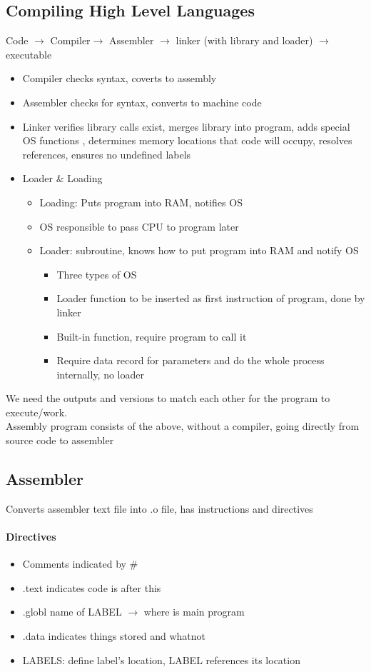 \documentclass[12 pt]{article}
\begin{document}
\subsection{Compiling High Level Languages} Code $\to$ Compiler$\to$ Assembler $\to$ linker (with library and loader) $\to$ executable
\begin{itemize}
\item Compiler checks syntax, coverts to assembly
\item Assembler checks for syntax, converts to machine code
\item Linker verifies library calls exist, merges library into program, adds special OS functions , determines memory locations that code will occupy, resolves references, ensures no undefined labels
\item Loader \& Loading
\begin{itemize}
\item Loading: Puts program into RAM, notifies OS
\item OS responsible to pass CPU to program later
\item Loader: subroutine, knows how to put program into RAM and notify OS
\begin{itemize}
\item Three types of OS
\item Loader function to be inserted as first instruction of program, done by linker
\item Built-in function, require program to call it
\item Require data record for parameters and do the whole process internally, no loader
\end{itemize}
\end{itemize}
\end{itemize}
We need the outputs and versions to match each other for the program to execute/work.
\\ Assembly program consists of the above, without a compiler, going directly from source code to assembler
\subsection{Assembler} Converts assembler text file into .o file, has instructions and directives
\paragraph{Directives}
\begin{itemize}
		\item Comments indicated by \#
		\item .text indicates code is after this
		\item .globl name of LABEL $\to$ where is main program
		\item .data indicates things stored and whatnot
		\item LABELS: define label's location, LABEL references its location
		\end{itemize}
\end{document}
